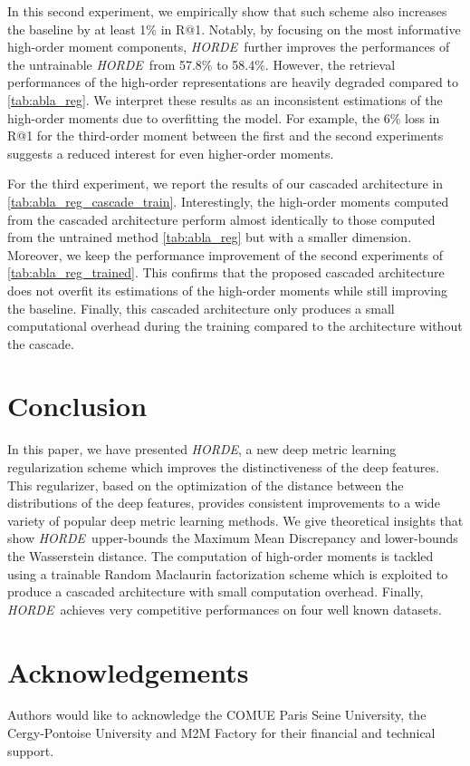 \documentclass[10pt,twocolumn,letterpaper]{article}
\def\ourmethod{\textit{HORDE}}
\begin{document}
        In this second experiment, we empirically show that such scheme also increases the baseline by at least 1\% in R@1.
        Notably, by focusing on the most informative high-order moment components, \ourmethod \ further improves the performances of the untrainable \ourmethod\ from 57.8\% to 58.4\%.
        However, the retrieval performances of the high-order representations are heavily degraded compared to \autoref{tab:abla_reg}.
        We interpret these results as an inconsistent estimations of the high-order moments due to overfitting the model.
        For example, the 6\% loss in R@1 for the third-order moment between the first and the second experiments suggests a reduced interest for even higher-order moments.
        
        For the third experiment, we report the results of our cascaded architecture in \autoref{tab:abla_reg_cascade_train}.
        Interestingly, the high-order moments computed from the cascaded architecture perform almost identically to those computed from the untrained method \autoref{tab:abla_reg} but with a smaller dimension.
        Moreover, we keep the performance improvement of the second experiments of \autoref{tab:abla_reg_trained}.
        This confirms that the proposed cascaded architecture does not overfit its estimations of the high-order moments while still improving the baseline.
        Finally, this cascaded architecture only produces a small computational overhead during the training compared to the architecture without the cascade.




 
\section{Conclusion}\label{sec:ccl}
    In this paper, we have presented \ourmethod, a new deep metric learning regularization scheme which improves the distinctiveness of the deep features.
    This regularizer, based on the optimization of the distance between the distributions of the deep features, provides consistent improvements to a wide variety of popular deep metric learning methods.
    We give theoretical insights that show \ourmethod \ upper-bounds the Maximum Mean Discrepancy and lower-bounds the Wasserstein distance.
    The computation of high-order moments is tackled using a trainable Random Maclaurin factorization scheme which is exploited to produce a cascaded architecture with small computation overhead.
    Finally, \ourmethod \ achieves very competitive performances on four well known datasets.
    
\section*{Acknowledgements}
    Authors would like to acknowledge the COMUE Paris Seine University, the Cergy-Pontoise University and M2M Factory for their financial and technical support.
     


\end{document}
